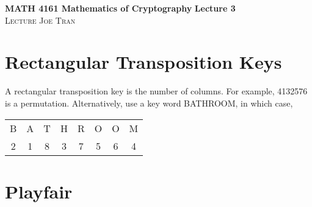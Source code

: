 \documentclass[11pt]{article}
\theoremstyle{definition}\newtheorem{definition}{Definition}
\theoremstyle{definition}\newtheorem{example}{Example}
\theoremstyle{definition}\newtheorem{samplecode}{Sample Code}
\begin{document}
\noindent \textbf{MATH 4161 Mathematics of Cryptography} \hfill \textbf{Lecture 3} \\
\noindent \textsc{Lecture} \hfill \textsc{Joe Tran}

\tableofcontents

\section{Rectangular Transposition Keys}

A rectangular transposition key is the number of columns. For example, 4132576 is a permutation. Alternatively, use a key word \textsf{BATHROOM}, in which case,
\begin{center}
    \begin{tabular}{cccccccc}
        B & A & T & H & R & O & O & M \\
        2 & 1 & 8 & 3 & 7 & 5 & 6 & 4
    \end{tabular}
\end{center}

\section{Playfair}
\end{document}
